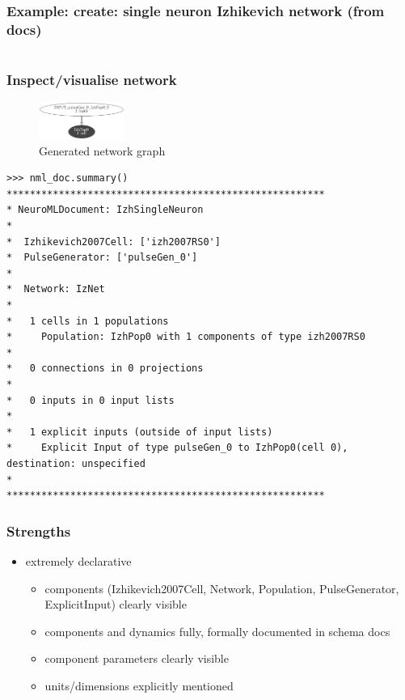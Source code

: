 \begin{frame}[t]
  \frametitle{Example: create: single neuron Izhikevich network (from docs)}
  \inputminted[fontsize=\tiny,firstnumber=1,firstline=21,lastline=47,linenos]{python}{./extras/izhikevich-single-neuron.py}
\end{frame}
\begin{frame}[t,fragile]
  \frametitle{Inspect/visualise network}
  \begin{figure}[h]
    \centering
    \includegraphics[width=0.25\textwidth]{99_images/IzNet.gv}
    \caption{Generated network graph}%
    \label{fig:99_images-IzNet-gv}
  \end{figure}
 \begin{verbatim}
>>> nml_doc.summary()
*******************************************************
* NeuroMLDocument: IzhSingleNeuron
*
*  Izhikevich2007Cell: ['izh2007RS0']
*  PulseGenerator: ['pulseGen_0']
*
*  Network: IzNet
*
*   1 cells in 1 populations 
*     Population: IzhPop0 with 1 components of type izh2007RS0
*
*   0 connections in 0 projections 
*
*   0 inputs in 0 input lists 
*
*   1 explicit inputs (outside of input lists)
*     Explicit Input of type pulseGen_0 to IzhPop0(cell 0), destination: unspecified
*
*******************************************************
 \end{verbatim}
\end{frame}
\begin{frame}[t]
  \frametitle{Strengths}
  \begin{itemize}
      \item extremely \alert{declarative}
        \begin{itemize}
          \item components (Izhikevich2007Cell, Network, Population, PulseGenerator, ExplicitInput) clearly visible
          \item components and dynamics fully, formally documented in schema docs
          \item component parameters clearly visible
          \item units/dimensions explicitly mentioned
        \end{itemize}
  \end{itemize}
\end{frame}

